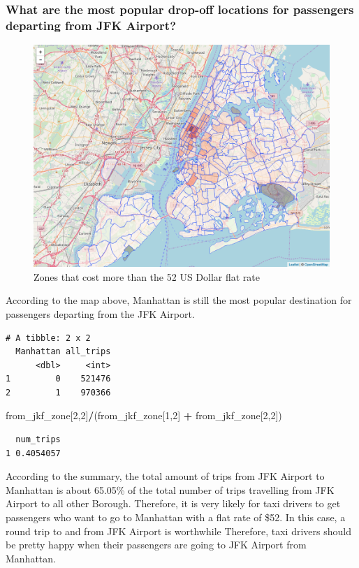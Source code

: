 \documentclass[12pt,twoside]{reedthesis}
\newenvironment{Shaded}{\begin{snugshade}}{\end{snugshade}}
\newcommand{\DecValTok}[1]{\textcolor[rgb]{0.00,0.00,0.81}{#1}}
\newcommand{\StringTok}[1]{\textcolor[rgb]{0.31,0.60,0.02}{#1}}
\newcommand{\OperatorTok}[1]{\textcolor[rgb]{0.81,0.36,0.00}{\textbf{#1}}}
\newcommand{\NormalTok}[1]{#1}
\theoremstyle{definition}
\theoremstyle{definition}
\theoremstyle{definition}
\theoremstyle{remark}
\begin{document}
\subsubsection{What are the most popular drop-off locations for
passengers departing from JFK
Airport?}\label{what-are-the-most-popular-drop-off-locations-for-passengers-departing-from-jfk-airport}
\begin{figure}

{\centering \includegraphics[width=4.96in]{figure/from_jkf_num_trips} 

}

\caption{Zones that cost more than the 52 US Dollar flat rate}\label{fig:from-jkf-num-trips}
\end{figure}
According to the map above, Manhattan is still the most popular
destination for passengers departing from the JFK Airport.
\begin{verbatim}
# A tibble: 2 x 2
  Manhattan all_trips
      <dbl>     <int>
1         0    521476
2         1    970366
\end{verbatim}
\begin{Shaded}
\begin{Highlighting}[]
\NormalTok{from_jkf_zone[}\DecValTok{2}\NormalTok{,}\DecValTok{2}\NormalTok{]}\OperatorTok{/}\NormalTok{(from_jkf_zone[}\DecValTok{1}\NormalTok{,}\DecValTok{2}\NormalTok{] }\OperatorTok{+}\StringTok{ }\NormalTok{from_jkf_zone[}\DecValTok{2}\NormalTok{,}\DecValTok{2}\NormalTok{])}
\end{Highlighting}
\end{Shaded}
\begin{verbatim}
  num_trips
1 0.4054057
\end{verbatim}
According to the summary, the total amount of trips from JFK Airport to
Manhattan is about 65.05\% of the total number of trips travelling from
JFK Airport to all other Borough. Therefore, it is very likely for taxi
drivers to get passengers who want to go to Manhattan with a flat rate
of \$52. In this case, a round trip to and from JFK Airport is
worthwhile Therefore, taxi drivers should be pretty happy when their
passengers are going to JFK Airport from Manhattan.
\end{document}
